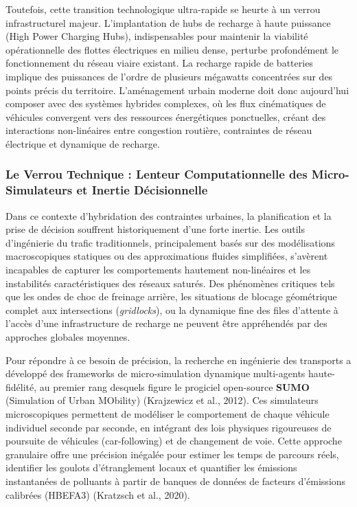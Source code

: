 \documentclass[11pt, a4paper]{article}
\begin{document}
Toutefois, cette transition technologique ultra-rapide se heurte à un
verrou infrastructurel majeur. L'implantation de hubs de recharge à
haute puissance (High Power Charging Hubs), indispensables pour
maintenir la viabilité opérationnelle des flottes électriques en milieu
dense, perturbe profondément le fonctionnement du réseau viaire
existant. La recharge rapide de batteries implique des puissances de
l'ordre de plusieurs mégawatts concentrées sur des points précis du
territoire. L'aménagement urbain moderne doit donc aujourd'hui composer
avec des systèmes hybrides complexes, où les flux cinématiques de
véhicules convergent vers des ressources énergétiques ponctuelles,
créant des interactions non-linéaires entre congestion routière,
contraintes de réseau électrique et dynamique de recharge.

\subsubsection{Le Verrou Technique : Lenteur Computationnelle des
Micro-Simulateurs et Inertie
Décisionnelle}\label{le-verrou-technique-lenteur-computationnelle-des-micro-simulateurs-et-inertie-duxe9cisionnelle}

Dans ce contexte d'hybridation des contraintes urbaines, la
planification et la prise de décision souffrent historiquement d'une
forte inertie. Les outils d'ingénierie du trafic traditionnels,
principalement basés sur des modélisations macroscopiques statiques ou
des approximations fluides simplifiées, s'avèrent incapables de capturer
les comportements hautement non-linéaires et les instabilités
caractéristiques des réseaux saturés. Des phénomènes critiques tels que
les ondes de choc de freinage arrière, les situations de blocage
géométrique complet aux intersections (\emph{gridlocks}), ou la
dynamique fine des files d'attente à l'accès d'une infrastructure de
recharge ne peuvent être appréhendés par des approches globales
moyennes.

Pour répondre à ce besoin de précision, la recherche en ingénierie des
transports a développé des frameworks de micro-simulation dynamique
multi-agents haute-fidélité, au premier rang desquels figure le
progiciel open-source \textbf{SUMO} (Simulation of Urban MObility)
(Krajzewicz et al., 2012). Ces simulateurs microscopiques permettent de
modéliser le comportement de chaque véhicule individuel seconde par
seconde, en intégrant des lois physiques rigoureuses de poursuite de
véhicules (car-following) et de changement de voie. Cette approche
granulaire offre une précision inégalée pour estimer les temps de
parcours réels, identifier les goulots d'étranglement locaux et
quantifier les émissions instantanées de polluants à partir de banques
de données de facteurs d'émissions calibrées (HBEFA3) (Kratzsch et al.,
2020).
\end{document}
